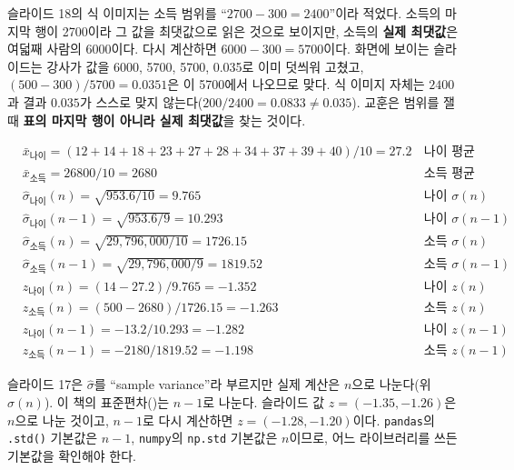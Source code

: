 \begin{pitfall}
슬라이드 18의 식 이미지는 소득 범위를 ``$2700-300=2400$''이라 적었다.
소득의 마지막 행이 2700이라 그 값을 최댓값으로 읽은 것으로 보이지만,
소득의 \textbf{실제 최댓값}은 여덟째 사람의 6000이다. 다시 계산하면
$6000 - 300 = 5700$이다. 화면에 보이는 슬라이드는 강사가 값을 6000,
5700, 5700, 0.035로 이미 덧씌워 고쳤고, $(500-300)/5700 = 0.0351$은
이 5700에서 나오므로 맞다. 식 이미지 자체는 $2400$과 결과 $0.035$가
스스로 맞지 않는다($200/2400 = 0.0833 \ne 0.035$). 교훈은 범위를 잴 때
\textbf{표의 마지막 행이 아니라 실제 최댓값}을 찾는 것이다.
\end{pitfall}

\begin{align*}
  &\bar x_{\text{나이}} = (12{+}14{+}18{+}23{+}27{+}28{+}34{+}37{+}39{+}40)/10 = 27.2 && \text{나이 평균}\\
  &\bar x_{\text{소득}} = 26800/10 = 2680 && \text{소득 평균}\\
  &\hat\sigma_{\text{나이}}(n) = \sqrt{953.6/10} = 9.765 && \text{나이 } \sigma(n)\\
  &\hat\sigma_{\text{나이}}(n{-}1) = \sqrt{953.6/9} = 10.293 && \text{나이 } \sigma(n{-}1)\\
  &\hat\sigma_{\text{소득}}(n) = \sqrt{29{,}796{,}000/10} = 1726.15 && \text{소득 } \sigma(n)\\
  &\hat\sigma_{\text{소득}}(n{-}1) = \sqrt{29{,}796{,}000/9} = 1819.52 && \text{소득 } \sigma(n{-}1)\\
  &z_{\text{나이}}(n) = (14-27.2)/9.765 = -1.352 && \text{나이 } z(n)\\
  &z_{\text{소득}}(n) = (500-2680)/1726.15 = -1.263 && \text{소득 } z(n)\\
  &z_{\text{나이}}(n{-}1) = -13.2/10.293 = -1.282 && \text{나이 } z(n{-}1)\\
  &z_{\text{소득}}(n{-}1) = -2180/1819.52 = -1.198 && \text{소득 } z(n{-}1)
\end{align*}

\begin{pitfall}[슬라이드 값은 $z = (-1.35, -1.26)$, 다시 계산하면
$z = (-1.28, -1.20)$]
슬라이드 17은 $\hat\sigma$를 ``sample variance''라 부르지만 실제 계산은
$n$으로 나눈다(위 $\hat\sigma(n)$). 이 책의 표준편차()는
$n-1$로 나눈다. 슬라이드 값 $z = (-1.35, -1.26)$은 $n$으로 나눈 것이고,
$n-1$로 다시 계산하면 $z = (-1.28, -1.20)$이다. \texttt{pandas}의
\texttt{.std()} 기본값은 $n-1$, \texttt{numpy}의 \texttt{np.std}
기본값은 $n$이므로, 어느 라이브러리를 쓰든 기본값을 확인해야 한다.
\end{pitfall}

